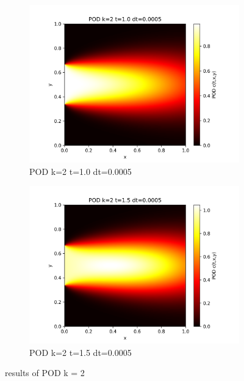 \documentclass[11pt,a4 paper,one side]{article}
\begin{document}
\begin{figure}[htbp]
    \vspace{0.5cm}  %
    
    \begin{subfigure}{0.45\textwidth}
        \includegraphics[width=\textwidth]{POD k=2 t=1.0 dt=0.0005.png}
        \caption{POD k=2 t=1.0 dt=0.0005}
        \label{POD k=2 t=1.0 dt=0.0005}
    \end{subfigure}
    \hfill
    \begin{subfigure}{0.45\textwidth}
        \includegraphics[width=\textwidth]{POD k=2 t=1.5 dt=0.0005.png}
        \caption{POD k=2 t=1.5 dt=0.0005}
        \label{POD k=2 t=1.5 dt=0.0005}
    \end{subfigure}
    
    \caption{results of POD k = 2}
    \label{results of POD k = 2}
\end{figure}
\end{document}
